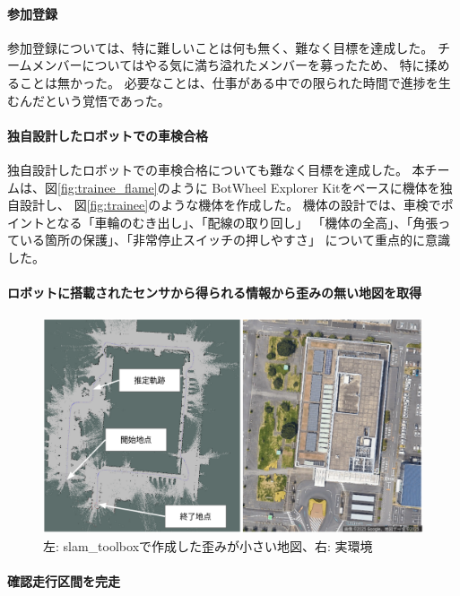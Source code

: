 \documentclass[twocolumn,9pt]{jsproceedings}
\begin{document}
\paragraph{参加登録}
参加登録については、特に難しいことは何も無く、難なく目標を達成した。
チームメンバーについてはやる気に満ち溢れたメンバーを募ったため、
特に揉めることは無かった。
必要なことは、仕事がある中での限られた時間で進捗を生むんだという覚悟であった。

\paragraph{独自設計したロボットでの車検合格}
独自設計したロボットでの車検合格についても難なく目標を達成した。
本チームは、図\ref{fig:trainee_flame}のように
BotWheel Explorer Kitをベースに機体を独自設計し、
図\ref{fig:trainee}のような機体を作成した。
機体の設計では、車検でポイントとなる「車輪のむき出し」、「配線の取り回し」
「機体の全高」、「角張っている箇所の保護」、「非常停止スイッチの押しやすさ」
について重点的に意識した。

\paragraph{ロボットに搭載されたセンサから得られる情報から歪みの無い地図を取得}

\begin{figure}[h]
  \begin{center}
    \includegraphics[width=1.0\linewidth]{figs/map.pdf}
    \caption{左: slam\_toolboxで作成した歪みが小さい地図、右: 実環境}
    \label{fig:map}
  \end{center}
\end{figure}

\paragraph{確認走行区間を完走}
\end{document}
